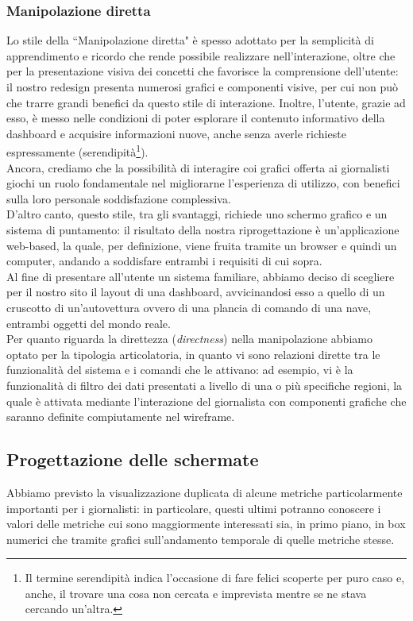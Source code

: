 \subsubsection{Manipolazione diretta}
\label{sss:manipolazione-diretta}
Lo stile della ``Manipolazione diretta" è spesso adottato per la semplicità di apprendimento e ricordo che rende possibile realizzare nell'interazione, oltre che per la presentazione visiva dei concetti che favorisce la comprensione dell'utente: il nostro redesign presenta numerosi grafici e componenti visive, per cui non può che trarre grandi benefici da questo stile di interazione. Inoltre, l'utente, grazie ad esso, è messo nelle condizioni di poter esplorare il contenuto informativo della dashboard e acquisire informazioni nuove, anche senza averle richieste espressamente (serendipità\footnote{Il termine serendipità indica l'occasione di fare felici scoperte per puro caso e, anche, il trovare una cosa non cercata e imprevista mentre se ne stava cercando un'altra.}).\\
Ancora, crediamo che la possibilità di interagire coi grafici offerta ai giornalisti giochi un ruolo fondamentale nel migliorarne l'esperienza di utilizzo, con benefici sulla loro personale soddisfazione complessiva.\\
D'altro canto, questo stile, tra gli svantaggi, richiede uno schermo grafico e un sistema di puntamento: il risultato della nostra riprogettazione è un'applicazione web-based, la quale, per definizione, viene fruita tramite un browser e quindi un computer, andando a soddisfare entrambi i requisiti di cui sopra.\\
Al fine di presentare all'utente un sistema familiare, abbiamo deciso di scegliere per il nostro sito il layout di una dashboard, avvicinandosi esso a quello di un cruscotto di un'autovettura ovvero di una plancia di comando di una nave, entrambi oggetti del mondo reale.\\
Per quanto riguarda la direttezza (\textit{directness}) nella manipolazione abbiamo optato per la tipologia articolatoria, in quanto vi sono relazioni dirette tra le funzionalità del sistema e i comandi che le attivano: ad esempio, vi è la funzionalità di filtro dei dati presentati a livello di una o più specifiche regioni, la quale è attivata mediante l'interazione del giornalista con componenti grafiche che saranno definite compiutamente nel wireframe.

\subsection{Progettazione delle schermate}
\label{ss:progettazione-schermate}
Abbiamo previsto la visualizzazione duplicata di alcune metriche particolarmente importanti per i giornalisti: in particolare, questi ultimi potranno conoscere i valori delle metriche cui sono maggiormente interessati sia, in primo piano, in box numerici che tramite grafici sull'andamento temporale di quelle metriche stesse.

